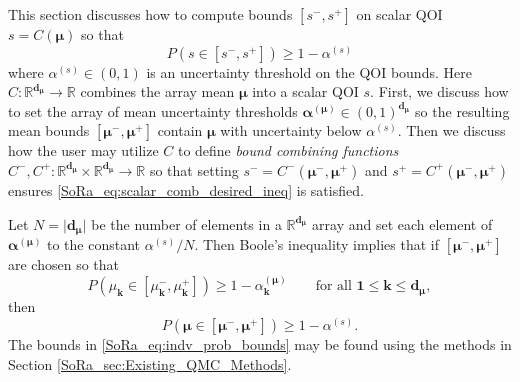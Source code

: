 \documentclass[graybox]{svmult}
\begin{document}
This section discusses how to compute bounds $[s^-,s^+]$ on scalar QOI $s = C(\boldsymbol{\mu})$ so that 
\begin{equation}
    P(s \in [s^-,s^+]) \geq 1-\alpha^{(s)}
    \label{SoRa_eq:scalar_comb_desired_ineq}
\end{equation}
where $\alpha^{(s)} \in (0,1)$ is an uncertainty threshold on the QOI bounds. Here $C: \mathbb{R}^{\boldsymbol{d}_{\boldsymbol{\mu}}} \to \mathbb{R}$ combines the array mean $\boldsymbol{\mu}$ into a scalar QOI $s$. First, we discuss how to set the array of mean uncertainty thresholds $\boldsymbol{\alpha}^{(\boldsymbol{\mu})} \in (0,1)^{\boldsymbol{d}_{\boldsymbol{\mu}}}$ so the resulting mean bounds $[\boldsymbol{\mu}^-,\boldsymbol{\mu}^+]$ contain $\boldsymbol{\mu}$ with uncertainty below $\alpha^{(s)}$. Then we discuss how the user may utilize $C$ to define \emph{bound combining functions} $C^-,C^+: \mathbb{R}^{\boldsymbol{d}_{\boldsymbol{\mu}}} \times \mathbb{R}^{\boldsymbol{d}_{\boldsymbol{\mu}}} \to \mathbb{R}$ so that setting $s^- = C^-(\boldsymbol{\mu}^-,\boldsymbol{\mu}^+)$ and $s^+ = C^+(\boldsymbol{\mu}^-,\boldsymbol{\mu}^+)$ ensures \eqref{SoRa_eq:scalar_comb_desired_ineq} is satisfied.

Let $N = \lvert \boldsymbol{d}_{\boldsymbol{\mu}} \rvert$ be the number of elements in a $\mathbb{R}^{\boldsymbol{d}_{\boldsymbol{\mu}}}$ array and set each element of $\boldsymbol{\alpha}^{(\boldsymbol{\mu})}$ to the constant $\alpha^{(s)}/ N$. Then Boole's inequality \cite{boole1847mathematical} implies that if $[\boldsymbol{\mu}^-,\boldsymbol{\mu}^+]$ are chosen so that
\begin{equation}
    P(\mu_{\boldsymbol{k}} \in [\mu_{\boldsymbol{k}}^-,\mu_{\boldsymbol{k}}^+]) \geq 1-\alpha_{\boldsymbol{k}}^{(\boldsymbol{\mu})}  \qquad \text{for all }\boldsymbol{1} \leq \boldsymbol{k} \leq \boldsymbol{d}_{\boldsymbol{\mu}},
    \label{SoRa_eq:indv_prob_bounds}
\end{equation}
then  
\begin{equation}
    P(\boldsymbol{\mu} \in [\boldsymbol{\mu}^-,\boldsymbol{\mu}^+]) \geq 1-\alpha^{(s)}.
    \label{SoRa_eq:indv_prob_bounds_all}
\end{equation}
The bounds in \eqref{SoRa_eq:indv_prob_bounds} may be found using the methods in Section \ref{SoRa_sec:Existing_QMC_Methods}.
\end{document}

